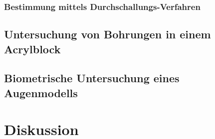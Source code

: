 \subsubsection{Bestimmung mittels Durchschallungs-Verfahren}
\subsection{Untersuchung von Bohrungen in einem Acrylblock}
\label{sec_bohrung}
\subsection{Biometrische Untersuchung eines Augenmodells}

\section{Diskussion}





